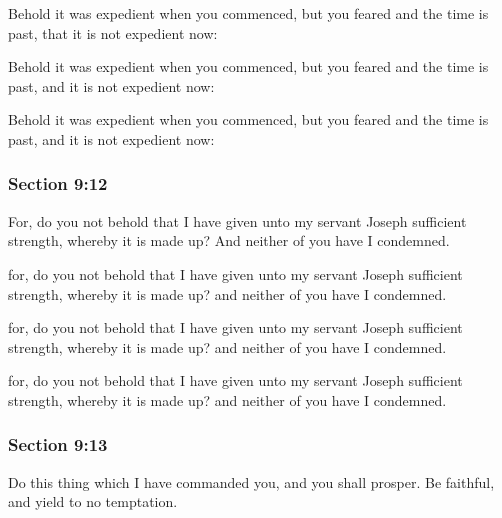		\begin{framed}
		\scriptsize
			\begin{compactdesc}
				\item[JSP] Behold it was expedient when you commenced, but you feared and the time is past, that it is not expedient now:
				\item[RB1] [\textit{missing}]
				\item[DC 1835] Behold it was expedient when you commenced, but you feared and the time is past, and it is not expedient now:
				\item[DC 1844] Behold it was expedient when you commenced, but you feared and the time is past, and it is not expedient now: 
			\end{compactdesc}
		\end{framed}

	\subsubsection{Section 9:12} %
		\label{DC9-12}

		For, do you not behold that I have given unto my servant Joseph sufficient strength, whereby it is made up?  And neither of you have I condemned.

		\begin{framed}
		\scriptsize
			\begin{compactdesc}
				\item[JSP] for, do you not behold that I have given unto my servant Joseph sufficient strength, whereby it is made up? and neither of you have I condemned.
				\item[RB1] [\textit{missing}]
				\item[DC 1835] for, do you not behold that I have given unto my servant Joseph sufficient strength, whereby it is made up? and neither of you have I condemned.
				\item[DC 1844] for, do you not behold that I have given unto my servant Joseph sufficient strength, whereby it is made up? and neither of you have I condemned.
			\end{compactdesc}
		\end{framed}

	\subsubsection{Section 9:13} %
		\label{DC9-13}

		Do this thing which I have commanded you, and you shall prosper.  Be faithful, and yield to no temptation.


